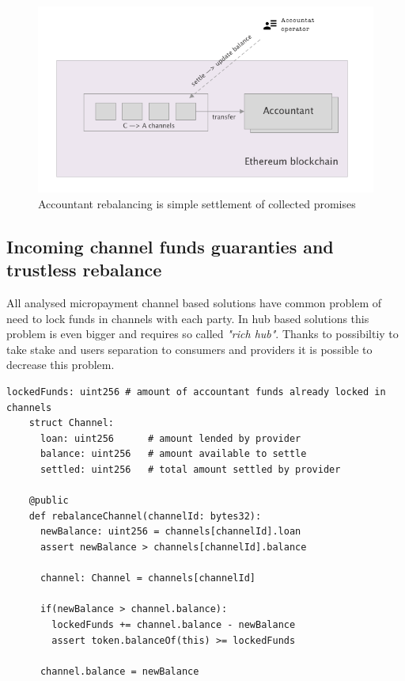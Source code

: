 \documentclass[a4paper,12pt]{article}
\begin{document}
\begin{figure}[H]
    \centering
    \includegraphics[scale=0.5]{../img/accountant-rebalance}
    \caption{Accountant rebalancing is simple settlement of collected promises}
    \label{img:accountant-rebalance}
\end{figure}

\subsection{Incoming channel funds guaranties and trustless rebalance}

All analysed micropayment channel based solutions have common problem of need 
to lock funds in channels with each party. In hub based solutions this problem 
is even bigger and requires so called \textit{"rich hub"}. Thanks to possibiltiy 
to take stake and users separation to consumers and providers it is possible to 
decrease this problem.

\begin{lstlisting}[language=Vyper]
    lockedFunds: uint256 # amount of accountant funds already locked in channels
    struct Channel:
      loan: uint256      # amount lended by provider
      balance: uint256   # amount available to settle
      settled: uint256   # total amount settled by provider

    @public
    def rebalanceChannel(channelId: bytes32):
      newBalance: uint256 = channels[channelId].loan
      assert newBalance > channels[channelId].balance

      channel: Channel = channels[channelId]

      if(newBalance > channel.balance):
        lockedFunds += channel.balance - newBalance
        assert token.balanceOf(this) >= lockedFunds

      channel.balance = newBalance
\end{lstlisting}
\end{document}
